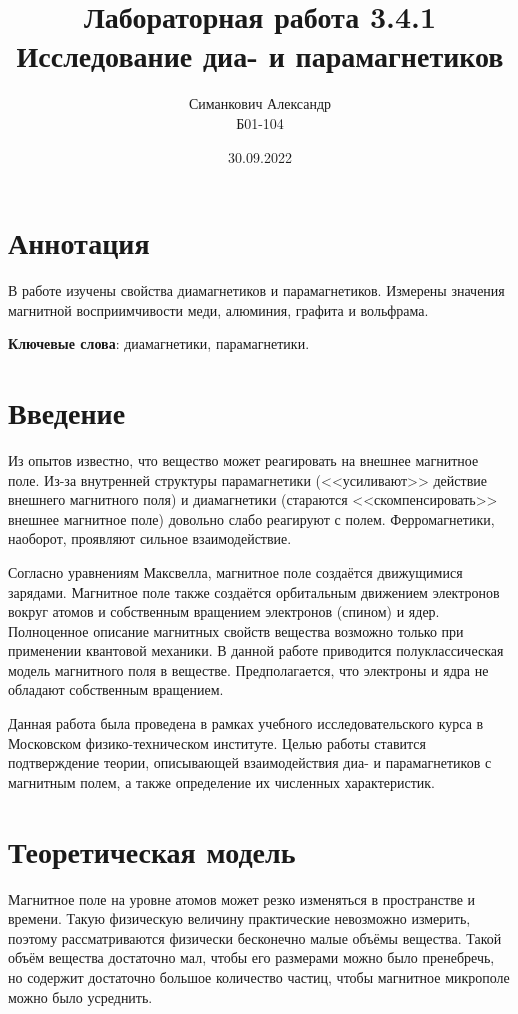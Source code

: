 \documentclass[12pt,a4paper]{article}
\title{Лабораторная работа 3.4.1\\ Исследование диа- и парамагнетиков}
\author{Симанкович Александр \\ Б01-104}
\date{30.09.2022}
\begin{document}
	\maketitle
	
	\section*{Аннотация}
	
	В работе изучены свойства диамагнетиков и парамагнетиков. Измерены значения магнитной восприимчивости меди, алюминия, графита и вольфрама.
	
	\vspace{10pt}
	\noindent\textbf{Ключевые слова}: диамагнетики, парамагнетики.
	
	\section*{Введение}
	
	Из опытов известно, что вещество может реагировать на внешнее магнитное поле. Из-за внутренней структуры парамагнетики (<<усиливают>> действие внешнего магнитного поля) и диамагнетики (стараются <<скомпенсировать>> внешнее магнитное поле) довольно слабо реагируют с полем. Ферромагнетики, наоборот, проявляют сильное взаимодействие.
	
	Согласно уравнениям Максвелла, магнитное поле создаётся движущимися зарядами. Магнитное поле также создаётся орбитальным движением электронов вокруг атомов и собственным вращением электронов (спином) и ядер. Полноценное описание магнитных свойств вещества возможно только при применении квантовой механики. В данной работе приводится полуклассическая модель магнитного поля в веществе. Предполагается, что электроны и ядра не обладают собственным вращением.
			
	Данная работа была проведена в рамках учебного исследовательского курса в Московском физико-техническом институте. Целью работы ставится подтверждение теории, описывающей взаимодействия диа- и парамагнетиков с магнитным полем, а также определение их численных характеристик.
	
	\section*{Теоретическая модель}
	
	Магнитное поле на уровне атомов может резко изменяться в пространстве и времени. Такую физическую величину практические невозможно измерить, поэтому рассматриваются физически бесконечно малые объёмы вещества. Такой объём вещества достаточно мал, чтобы его размерами можно было пренебречь, но содержит достаточно большое количество частиц, чтобы магнитное микрополе можно было усреднить.
	
\end{document}
